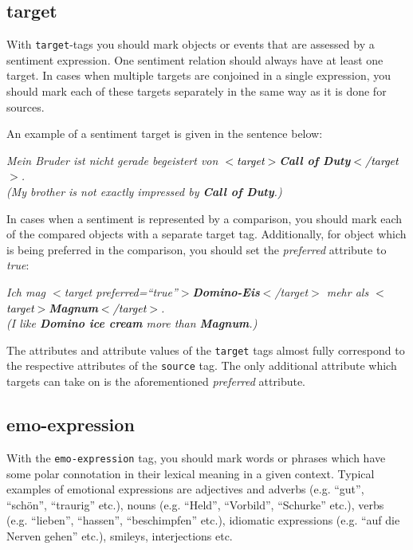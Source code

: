 \documentclass[11pt,a4paper]{article}
\newenvironment{example}{\begin{center}\begin{exe}\ex}{\end{exe}\end{center}}
\newcommand{\xmltag}[1]{\textcolor{black}{{\small$<$#1$>$}}}
\newcommand{\target}[1]{\xmltag{target}\textbf{#1}\xmltag{/target}}
\renewenvironment{example}{\begin{center}\itshape}{\upshape\end{center}}
\begin{document}
\subsection{target}
With \texttt{target}-tags you should mark objects or events that are
assessed by a sentiment expression.  One sentiment relation should
always have at least one target.  In cases when multiple targets are
conjoined in a single expression, you should mark each of these
targets separately in the same way as it is done for sources.

An example of a sentiment target is given in the sentence below:
\begin{example}
  \textit{Mein Bruder ist nicht gerade begeistert von \target{Call of
      Duty}.}\\ (\textit{My brother is not exactly impressed by
    \textbf{Call of Duty}.})
\end{example}

In cases when a sentiment is represented by a comparison, you should
mark each of the compared objects with a separate target tag.
Additionally, for object which is being preferred in the comparison,
you should set the \textit{preferred} attribute to \textit{true}:
\begin{example}
  \textit{Ich mag $<$target
    preferred=``true''$>$\textbf{Domino-Eis}$<$/target$>$ mehr als
    \target{Magnum}.}\\ (\textit{I like \textbf{Domino ice cream} more
    than \textbf{Magnum}.})
\end{example}

The attributes and attribute values of the \texttt{target} tags almost
fully correspond to the respective attributes of the \texttt{source}
tag.  The only additional attribute which targets can take on is the
aforementioned \textit{preferred} attribute.

\subsection{emo-expression}
With the \texttt{emo-expression} tag, you should mark words or phrases
which have some polar connotation in their lexical meaning in a given
context.  Typical examples of emotional expressions are adjectives and
adverbs (e.g. ``gut'', ``sch\"on'', ``traurig'' etc.), nouns
(e.g. ``Held'', ``Vorbild'', ``Schurke'' etc.), verbs
(e.g. ``lieben'', ``hassen'', ``beschimpfen'' etc.), idiomatic
expressions (e.g. ``auf die Nerven gehen'' etc.), smileys,
interjections etc.
\end{document}
